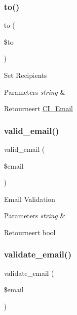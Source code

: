 \subsubsection{\texorpdfstring{to()}{to()}}
{\footnotesize\ttfamily to (\begin{DoxyParamCaption}\item[{}]{\$to }\end{DoxyParamCaption})}

Set Recipients


\begin{DoxyParams}{Parameters}
{\em string} & \\
\hline
\end{DoxyParams}
\begin{DoxyReturn}{Retourneert}
\mbox{\hyperlink{class_c_i___email}{C\+I\+\_\+\+Email}} 
\end{DoxyReturn}
\mbox{\label{class_c_i___email_abe07a23d74d453da8fb639b5c3951873}} 
\subsubsection{\texorpdfstring{valid\_email()}{valid\_email()}}
{\footnotesize\ttfamily valid\+\_\+email (\begin{DoxyParamCaption}\item[{}]{\$email }\end{DoxyParamCaption})}

Email Validation


\begin{DoxyParams}{Parameters}
{\em string} & \\
\hline
\end{DoxyParams}
\begin{DoxyReturn}{Retourneert}
bool 
\end{DoxyReturn}
\mbox{\label{class_c_i___email_a1907f0dba44e2968b8260dbc5770550f}} 
\subsubsection{\texorpdfstring{validate\_email()}{validate\_email()}}
{\footnotesize\ttfamily validate\+\_\+email (\begin{DoxyParamCaption}\item[{}]{\$email }\end{DoxyParamCaption})}

